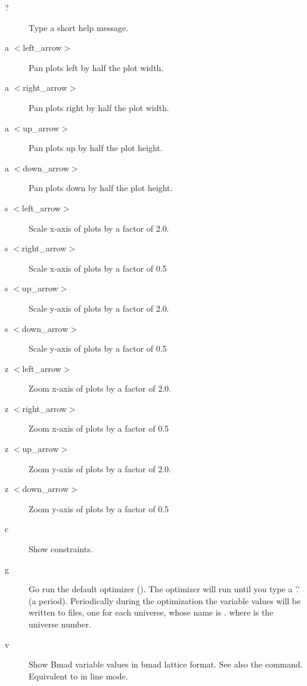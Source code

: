 {\begin{description}
\item[?]
Type a short help message.

\item[a $<$left\_arrow$>$]
Pan plots left by half the plot width.

\item[a $<$right\_arrow$>$]
Pan plots right by half the plot width.

\item[a $<$up\_arrow$>$]
Pan plots up by half the plot height.

\item[a $<$down\_arrow$>$]
Pan plots down by half the plot height.

\item[s $<$left\_arrow$>$]
Scale x-axis of plots by a factor of 2.0.

\item[s $<$right\_arrow$>$]
Scale x-axis of plots by a factor of 0.5

\item[s $<$up\_arrow$>$]
Scale y-axis of plots by a factor of 2.0.

\item[s $<$down\_arrow$>$]
Scale y-axis of plots by a factor of 0.5


\item[z $<$left\_arrow$>$]
Zoom x-axis of plots by a factor of 2.0.

\item[z $<$right\_arrow$>$]
Zoom x-axis of plots by a factor of 0.5

\item[z $<$up\_arrow$>$]
Zoom y-axis of plots by a factor of 2.0.

\item[z $<$down\_arrow$>$]
Zoom y-axis of plots by a factor of 0.5

\item[c]  
Show constraints.

\item[g]
Go run the default optimizer (). The optimizer will
run until you type a '.' (a period).  Periodically during the
optimization the variable values will be written to files, one for
each universe, whose name is . where \vn{\#} is
the universe number.

\item[v]
Show Bmad variable values in bmad lattice format. See also the
 command. Equivalent to  in line mode.


\end{description}}
